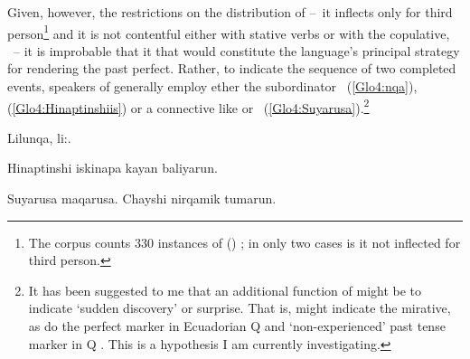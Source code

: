 \noindent
Given, however, the restrictions on the distribution of  --~it inflects only for third person\footnote{The corpus counts 330 instances of  () ; in only two cases is it not inflected for third person.} and it is not contentful either with stative verbs or with the copulative, ~-- it is improbable that it that would constitute the language’s principal strategy for rendering the past perfect. Rather, to indicate the sequence of two completed events, speakers of \SYQ{} generally employ ether the subordinator ~(\ref{Glo4:nqa}), (\ref{Glo4:Hinaptinshiis}) or a connective like  or ~(\ref{Glo4:Suyarusa}).\footnote{It has been suggested to me that an additional function of  might be to indicate ‘sudden discovery’ \citep{Adelaar77} or surprise. That is,  might indicate the mirative, as do the perfect marker  in Ecuadorian Q \citep{muysken1977syntactic} and ‘non-experienced’ past tense marker  in  Q \citep{Faller03} \citep[as cited in][223--33]{Peterson14}. This is a hypothesis I am currently investigating.}

%
{Lilunqa, li:.}%
{}%
{}{}%

%
{Hinaptinshi iskinapa kayan baliyarun.}%
{}%
{}{}%

%
{Suyarusa  maqarusa. Chayshi nirqamik tumarun.}%
{}%
{}{}%

